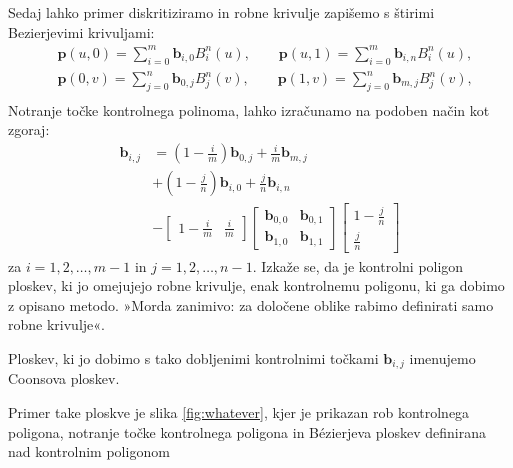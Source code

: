 \documentclass[a4paper,12pt]{article}
\begin{document}
Sedaj lahko primer diskritiziramo in robne krivulje zapišemo s štirimi 
Bezierjevimi krivuljami:
\begin{align*}
    &\mathbf{p}(u,0) =\sum_{i=0}^m \mathbf{b}_{i,0} B_i^n(u), \qquad
    \mathbf{p}(u,1) =\sum_{i=0}^m \mathbf{b}_{i,n} B_i^n(u),  \\
    &\mathbf{p}(0,v) =\sum_{j=0}^n \mathbf{b}_{0,j} B_j^n(v), \qquad
    \mathbf{p}(1,v) =\sum_{j=0}^n \mathbf{b}_{m,j} B_j^n(v),  \\
 \end{align*}
Notranje točke kontrolnega polinoma, lahko izračunamo na podoben način kot zgoraj: 
\begin{align*}
   \mathbf{b}_{i,j} &= \left(1 - \frac{i}{m}\right)\mathbf{b}_{0,j} +\frac{i}{m}\mathbf{b}_{m,j}\\
    &+ \left(1 - \frac{j}{n}\right)\mathbf{b}_{i,0} +\frac{j}{n}\mathbf{b}_{i,n}\ \\
   &- 
   \begin{bmatrix} 
      1 - \frac{i}{m} & \frac{i}{m}
   \end{bmatrix}
   \begin{bmatrix} 
      \mathbf{b}_{0,0} & \mathbf{b}_{0,1}\\
      \mathbf{b}_{1,0} & \mathbf{b}_{1,1}
   \end{bmatrix}
   \begin{bmatrix}
      1 - \frac{j}{n}\\
      \frac{j}{n}
   \end{bmatrix}
\end{align*}
za $i = 1,2,\dots,m-1$ in $j = 1,2,\dots,n-1$. Izkaže se, da je kontrolni poligon ploskev, 
ki jo omejujejo robne krivulje, enak kontrolnemu poligonu, ki ga dobimo z opisano metodo. 
»Morda zanimivo: za določene oblike rabimo definirati samo robne krivulje«.

Ploskev, ki jo dobimo s tako dobljenimi kontrolnimi točkami $\mathbf{b}_{i,j}$
imenujemo Coonsova ploskev.

Primer take ploskve je slika \ref{fig:whatever}, kjer je prikazan 
rob kontrolnega poligona, notranje točke kontrolnega poligona in 
Bézierjeva ploskev definirana nad kontrolnim poligonom
\end{document}
